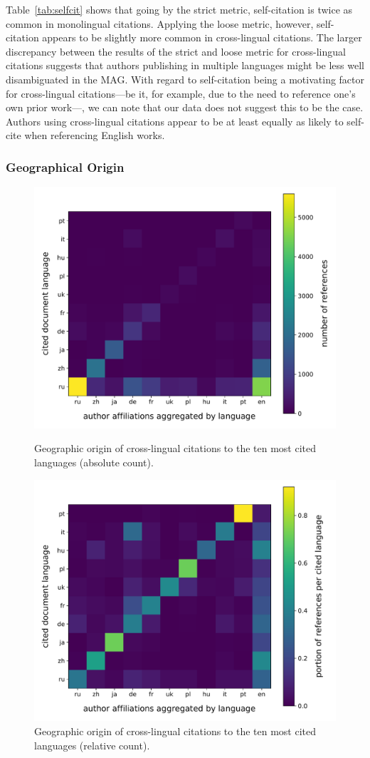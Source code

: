 Table~\ref{tab:selfcit} shows that going by the strict metric, self-citation is twice as common in monolingual citations. Applying the loose metric, however, self-citation appears to be slightly more common in cross-lingual citations. The larger discrepancy between the results of the strict and loose metric for cross-lingual citations suggests that authors publishing in multiple languages might be less well disambiguated in the MAG. With regard to self-citation being a motivating factor for cross-lingual citations---be it, for example, due to the need to reference one's own prior work---, we can note that our data does not suggest this to be the case. Authors using cross-lingual citations appear to be at least equally as likely to self-cite when referencing English works.

\subsubsection{Geographical Origin}

\begin{figure}[tb]
\centering
\includegraphics[width=0.7\linewidth]{figures/ref_xling/citlang_to_author_aff_absolute_crop.pdf}
\caption{Geographic origin of cross-lingual citations to the ten most cited languages (absolute count).} \label{fig:geo_abs}

\centering
\includegraphics[width=0.7\linewidth]{figures/ref_xling/citlang_to_author_aff_relative_crop.pdf}
\caption{Geographic origin of cross-lingual citations to the ten most cited languages (relative count).} \label{fig:geo_rel}
\end{figure}

